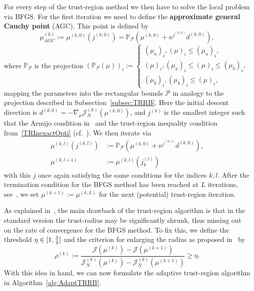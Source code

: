 For every step of the trust-region method we then have to solve the local problem via BFGS.\@
For the first iteration we need to define the \textbf{approximate general Cauchy point} (AGC).
This point is defined by
\begin{equation*}\label{AGCPoint}
    \mu_{AGC}^{(k)} := \mu^{(k, 0)}(j^{(k, 0)}) = \mathbb{P}_{\mathcal{P}} \left( \mu^{(k, 0)} + \kappa^{j^{(k, 0)}} d^{(k, 0)} \right),
\end{equation*}
where $\mathbb{P}_\mathcal{P}$ is the projection ${\left( \mathbb{P}_\mathcal{P}(\mu) \right)}_i := \begin{cases}
    {(\mu_a)}_i, {(\mu)}_i \leq {(\mu_a)}_i, \\
    {(\mu)}_i, {(\mu_a)}_i \leq {(\mu)}_i \leq {(\mu_b)}_i, \\
    {(\mu_b)}_i, {(\mu_b)}_i \leq {(\mu)}_i,
\end{cases}$
mapping the parameters into the rectangular bounds $\mathcal{P}$ in analogy to the projection described in Subsection~\ref{subsec:TRRB}.
Here the initial descent direction is $d^{(k, 0)} = - \nabla_\mu \mathcal{J}_N^{(k)}(\mu^{(k, 0)})$, and $j^{(k)}$ is the smallest integer such that the Armijo condition in~\cite[Inequality 4.4]{Keil2021} and the trust-region inequality condition from~\eqref{TRInexactOpti} (cf.~\cite[Inequality 4.5]{Keil2021}).
We then iterate via
\begin{align*}
    \mu^{(k, l)}(j^{(k, l)}) &:= \mathbb{P}_\mathcal{P} \left( \mu^{(k, 0)} + \kappa^{j^{(k, l)}} d^{(k, 0)} \right), \\
    \mu^{(k, l+ 1)} &:= \mu^{(k, l)}(j_k^{(l)})
\end{align*}
with this $j$ once again satisfying the same conditions for the indices $k, l$.
After the termination condition for the BFGS method has been reached at $L$ iterations, see~\cite[Inequalities 4.6a and 4.6b]{Keil2021}, we set $\mu^{(k + 1)} := \mu^{(k, L)}$ for the next (potential) trust-region iteration.

As explained in~\cite{Keil2021}, the main drawback of the trust-region algorithm is that in the standard version the trust-radius may be significantly shrunk, thus missing out on the rate of convergence for the BFGS method.
To fix this, we define the threshold $\eta \in \interval[open right]{1}{\frac{3}{4}}$ and the criterion for enlarging the radius as proposed in~\cite[Inequality 4.7]{Keil2021} by
\begin{equation*}\label{EnlargingCriterion}
    \rho^{(k)} := \frac{\mathcal{J}(\mu^{(k)}) - \mathcal{J}(\mu^{(k + 1)})}{\mathcal{J}_N^{(k)}(\mu^{(k)}) - \mathcal{J}_N^{(k)}(\mu^{(k + 1)})} \geq \eta.
\end{equation*}
With this idea in hand, we can now formulate the adaptive trust-region algorithm in Algorithm~\ref{alg:AdaptTRRB}.

